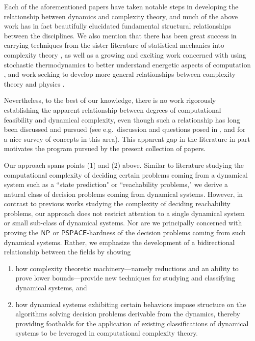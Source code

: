 \documentclass{amsart}
\theoremstyle{theorem}
\theoremstyle{remark}
\numberwithin{equation}{section}
\newcommand{\ccNP}{\textsf{\upshape NP}}
\begin{document}
Each of the aforementioned papers have taken notable steps in developing the relationship between dynamics and complexity theory, and much of the above work \cite{bournez2017polynomial,PhysRevLett.83.1463,cotler2024computational,bruera2024topological,ercsey2011optimization,sudoku2012chaos,rojas2025algorithmic} has in fact beautifully elucidated fundamental structural relationships between the disciplines.
We also mention that there has been great success in carrying techniques from the sister literature of statistical mechanics into complexity theory  \cite{percus2006computational, gogioso2014aspects, welsh1990computational,galanis2014phase}, as well as a growing and exciting work concerned with using stochastic thermodynamics to better understand energetic aspects of computation \cite{bennett1982thermodynamics, wolpert2019stochastic, kardecs2022inclusive, manzano2024thermodynamics, ouldridge2023thermodynamics,wolpert2024stochastic,PhysRevResearch.2.033312}, and work seeking to develop more general relationships between complexity theory and physics \cite{denef2007computational,denef2018computational}.

Nevertheless, to the best of our knowledge, there is no work rigorously establishing the apparent relationship between degrees of computational feasibility and dynamical complexity, even though such a relationship has long been discussed and pursued (see e.g.\ discussion and questions posed in \cite{bournez2013computability}, and \cite{yampolsky2021towards} for a nice survey of concepts in this area). This apparent gap in the literature in part motivates the program pursued by the present collection of papers.

Our approach spans points (1) and (2) above.
Similar to literature studying the computational complexity of deciding certain problems coming from a dynamical system such as a ``state prediction" or ``reachability problems," we derive a natural class of decision problems coming from dynamical systems.
However, in contrast to previous works studying the complexity of deciding reachability problems, our approach does not restrict attention to a single dynamical system or small sub-class of dynamical systems. Nor are we principally concerned with proving the $\ccNP$ or $\textsf{PSPACE}$-hardness of the decision problems coming from such dynamical systems.
Rather, we emphasize the development of a bidirectional relationship between the fields by showing
\begin{enumerate}
\item how complexity theoretic machinery---namely reductions and an ability to prove lower bounds---provide new techniques for studying and classifying dynamical systems, and
\item how dynamical systems exhibiting certain behaviors impose structure on the algorithms solving decision problems derivable from the dynamics, thereby providing footholds for the application of existing classifications of dynamical systems to be leveraged in computational complexity theory.
\end{enumerate}
\end{document}
